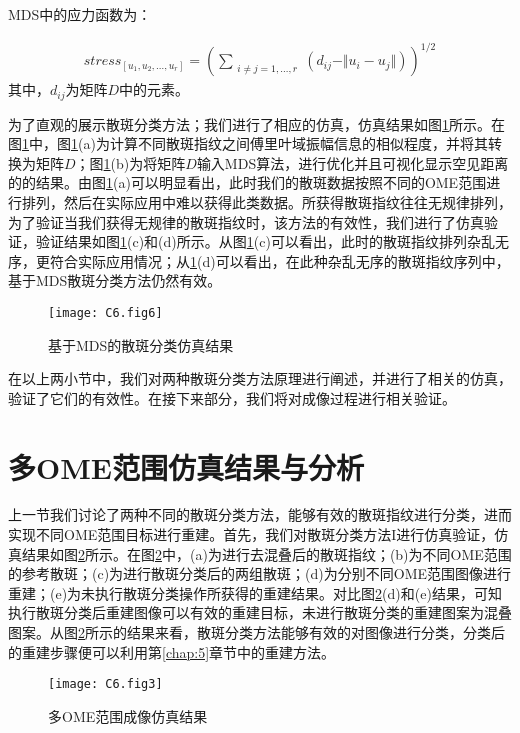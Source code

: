 MDS中的应力函数为：

\begin{equation}
\begin{aligned}
stress_{[u_1,u_2,\ldots, u_r]} =\left( \sum_{\substack{i\neq j = 1,\ldots,r} } (d_{ij}-\Vert u_{i}- u_{j} \Vert ) \right)^{1/2}
\label{eq:6.6}
\end{aligned}
\end{equation}
其中，$d_{ij}$为矩阵$D$中的元素。

为了直观的展示散斑分类方法；我们进行了相应的仿真，仿真结果如图\ref{fig:6.6}所示。在图\ref{fig:6.6}中，图\ref{fig:6.6}(a)为计算不同散斑指纹之间傅里叶域振幅信息的相似程度，并将其转换为矩阵$D$；图\ref{fig:6.6}(b)为将矩阵$D$输入MDS算法，进行优化并且可视化显示空见距离的的结果。由图\ref{fig:6.6}(a)可以明显看出，此时我们的散斑数据按照不同的OME范围进行排列，然后在实际应用中难以获得此类数据。所获得散斑指纹往往无规律排列，为了验证当我们获得无规律的散斑指纹时，该方法的有效性，我们进行了仿真验证，验证结果如图\ref{fig:6.6}(c)和(d)所示。从图\ref{fig:6.6}(c)可以看出，此时的散斑指纹排列杂乱无序，更符合实际应用情况；从\ref{fig:6.6}(d)可以看出，在此种杂乱无序的散斑指纹序列中，基于MDS散斑分类方法仍然有效。
\begin{figure}[htp]
	\centering
	\texttt{[image: C6.fig6]}
	\caption{基于MDS的散斑分类仿真结果}
	\label{fig:6.6}
\end{figure}

在以上两小节中，我们对两种散斑分类方法原理进行阐述，并进行了相关的仿真，验证了它们的有效性。在接下来部分，我们将对成像过程进行相关验证。

\section{多OME范围仿真结果与分析}

上一节我们讨论了两种不同的散斑分类方法，能够有效的散斑指纹进行分类，进而实现不同OME范围目标进行重建。首先，我们对散斑分类方法I进行仿真验证，仿真结果如图\ref{fig:6.3}所示。在图\ref{fig:6.3}中，(a)为进行去混叠后的散斑指纹；(b)为不同OME范围的参考散斑；(c)为进行散斑分类后的两组散斑；(d)为分别不同OME范围图像进行重建；(e)为未执行散斑分类操作所获得的重建结果。对比图\ref{fig:6.3}(d)和(e)结果，可知执行散斑分类后重建图像可以有效的重建目标，未进行散斑分类的重建图案为混叠图案。从图\ref{fig:6.3}所示的结果来看，散斑分类方法能够有效的对图像进行分类，分类后的重建步骤便可以利用第\ref{chap:5}章节中的重建方法。

\begin{figure}[htp]
	\centering
	\texttt{[image: C6.fig3]}
	\caption{多OME范围成像仿真结果}
	\label{fig:6.3}
\end{figure}

